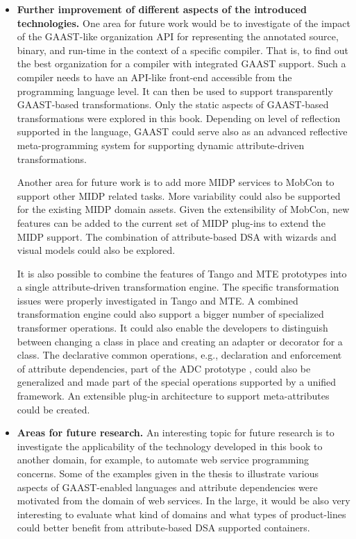 \begin{itemize}

\item \textbf{Further improvement of different aspects of the introduced technologies.} One area for future work would be to investigate of the impact of the GAAST-like organization API for representing the annotated source, binary, and run-time in the context of a specific compiler. That is, to find out the best organization for a compiler with integrated GAAST support. Such a compiler needs to have an API-like front-end accessible from the programming language level. It can then be used to support transparently GAAST-based transformations. Only the static aspects of GAAST-based transformations were explored in this book. Depending on level of reflection supported in the language, GAAST could serve also as an advanced reflective meta-programming system for supporting dynamic attribute-driven transformations.

Another area for future work is to add more MIDP services to MobCon to support other MIDP related tasks. More variability could also be supported for the existing MIDP domain assets. Given the extensibility of MobCon, new features can be added to the current set of MIDP plug-ins to extend the MIDP support. The combination of attribute-based DSA with wizards and visual models could also be explored.

It is also possible to combine the features of Tango and MTE prototypes into a single attribute-driven transformation engine. The specific transformation issues were properly investigated in Tango and MTE. A combined transformation engine could also support a bigger number of specialized transformer operations. It could also enable the developers to distinguish between changing a class in place and creating an adapter or decorator \cite{dpatterns} for a class. The declarative common operations, e.g., declaration and enforcement of attribute dependencies, part of the ADC prototype , could also be generalized and made part of the special operations supported by a unified framework. An extensible plug-in architecture to support meta-attributes could be created.

\item \textbf{Areas for future research.} An interesting topic for future research is to investigate the applicability of the technology developed in this book to another domain, for example, to automate web service programming concerns. Some of the examples given in the thesis to illustrate various aspects of GAAST-enabled languages and attribute dependencies were motivated from the domain of web services. 
In the large, it would be also very interesting to evaluate what kind of domains and what types of product-lines could better benefit from attribute-based DSA supported containers.

\end{itemize}




 
